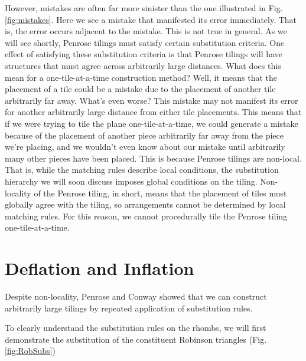 \documentclass[
  oneside,
  11pt, a4paper,
  footinclude=true,
  headinclude=true,
  cleardoublepage=empty
]{scrbook}
\begin{document}
However, mistakes are often far more sinister than the one illustrated in Fig.\ref{fig:mistakes}. Here we see a mistake that manifested its error immediately. That is, the error occurs adjacent to the mistake. This is not true in general. As we will see shortly, Penrose tilings must satisfy certain substitution criteria. One effect of satisfying these substitution criteria is that Penrose tilings will have structures that must agree across arbitrarily large distances. What does this mean for a one-tile-at-a-time construction method? Well, it means that the placement of a tile could be a mistake due to the placement of another tile arbitrarily far away. What's even worse? This mistake may not manifest its error for another arbitrarily large distance from either tile placements. This means that if we were trying to tile the plane one-tile-at-a-time, we could generate a mistake because of the placement of another piece arbitrarily far away from the piece we're placing, and we wouldn't even know about our mistake until arbitrarily many other pieces have been placed. This is because Penrose tilings are non-local. That is, while the matching rules describe local conditions, the substitution hierarchy we will soon discuss imposes global conditions on the tiling. Non-locality of the Penrose tiling, in short, means that the placement of tiles must globally agree with the tiling, so arrangements cannot be determined by local matching rules. For this reason, we cannot procedurally tile the Penrose tiling one-tile-at-a-time.


\section{Deflation and Inflation} %
Despite non-locality, Penrose and Conway showed that we can construct arbitrarily large tilings by repeated application of substitution rules.

To clearly understand the substitution rules on the rhombs, we will first demonstrate the substitution of the constituent Robinson triangles (Fig.\ref{fig:RobSubs})
\end{document}
